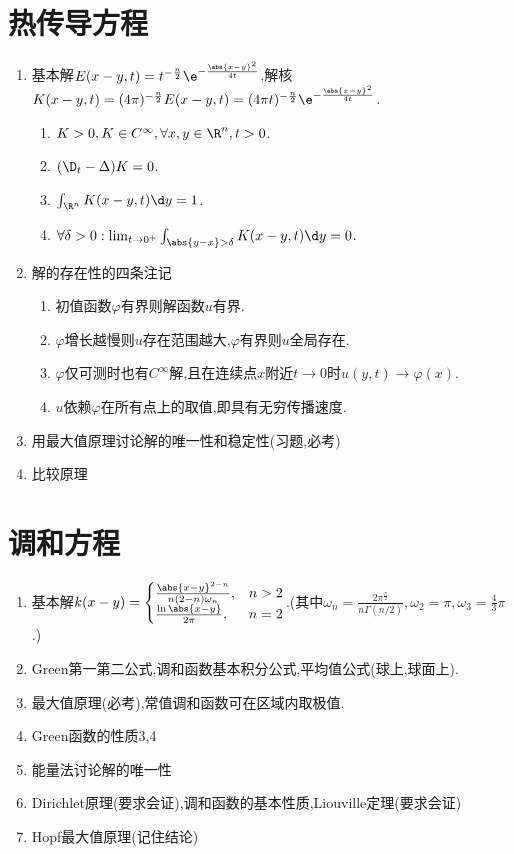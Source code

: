 \documentclass{article}
\begin{document}
\section{热传导方程}
\begin{enumerate}
    \item 基本解$E(x-y,t)=t^{-\frac{n}{2}}\e^{-\frac{\abs{x-y}^2}{4t}}$,解核$K(x-y,t)=(4\pi)^{-\frac{n}{2}}E(x-y,t)=(4\pi t)^{-\frac{n}{2}}\e^{-\frac{\abs{x-y}^2}{4t}}$.
    \begin{enumerate}
        \item $K>0,K\in C^{\infty},\forall x,y\in\R^n,t>0$.
        \item $(\D_t-\Delta)K=0$.
        \item $\int_{\R^n}K(x-y,t)\d y=1$.
        \item $\forall \delta>0:\lim_{t\to 0^+}\int_{\abs{y-x}>\delta}K(x-y,t)\d y=0$.
    \end{enumerate}
    \item 解的存在性的四条注记\begin{enumerate}
        \item 初值函数$\varphi$有界则解函数$u$有界.
        \item $\varphi$增长越慢则$u$存在范围越大,$\varphi$有界则$u$全局存在.
        \item $\varphi$仅可测时也有$C^\infty$解,且在连续点$x$附近$t\to 0$时$u(y,t)\to \varphi(x)$.
        \item $u$依赖$\varphi$在所有点上的取值,即具有无穷传播速度.
    \end{enumerate}
    \item 用最大值原理讨论解的唯一性和稳定性(习题,必考)
    \item 比较原理
\end{enumerate}
\section{调和方程}
\begin{enumerate}
    \item 基本解$k(x-y)=\begin{cases}
        \frac{\abs{x-y}^{2-n}}{n(2-n)\omega_n},&n>2\\
        \frac{\ln\abs{x-y}}{2\pi},&n=2
    \end{cases}$.(其中$\omega_n=\frac{2\pi^{\frac{n}{2}}}{n\Gamma(n/2)},\omega_2=\pi,\omega_3=\frac{4}{3}\pi$.)
    \item Green第一第二公式,调和函数基本积分公式,平均值公式(球上,球面上).
    \item 最大值原理(必考),常值调和函数可在区域内取极值.
    \item Green函数的性质3,4
    \item 能量法讨论解的唯一性
    \item Dirichlet原理(要求会证),调和函数的基本性质,Liouville定理(要求会证)
    \item Hopf最大值原理(记住结论)
\end{enumerate}
\end{document}
